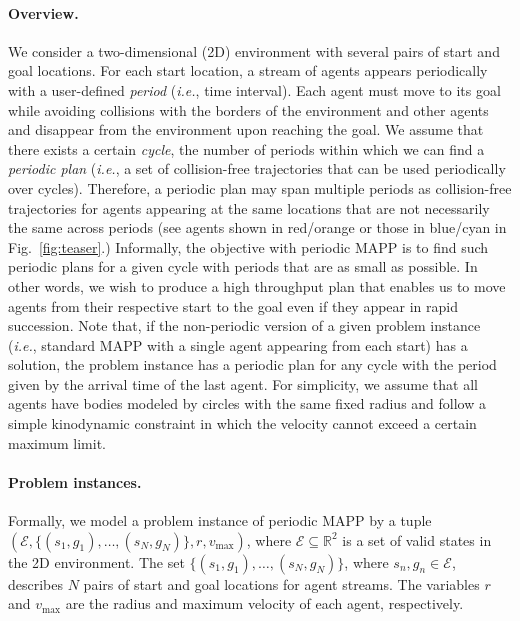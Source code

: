 \documentclass[letterpaper]{article} %
\def\ie{{\it i.e.}}
\begin{document}
\paragraph{Overview.}
We consider a two-dimensional (2D) environment with several pairs of start and goal locations. For each start location, a stream of agents appears periodically with a user-defined \emph{period} (\ie, time interval). Each agent must move to its goal while avoiding collisions with the borders of the environment and other agents and disappear from the environment upon reaching the goal. We assume that there exists a certain \emph{cycle}, the number of periods within which we can find a \emph{periodic plan} (\ie, a set of collision-free trajectories that can be used periodically over cycles). Therefore, a periodic plan may span multiple periods as collision-free trajectories for agents appearing at the same locations that are not necessarily the same across periods (see agents shown in red/orange or those in blue/cyan in Fig.~\ref{fig:teaser}.) Informally, the objective with periodic MAPP is to find such periodic plans for a given cycle with periods that are as small as possible. In other words, we wish to produce a high throughput plan that enables us to move agents from their respective start to the goal even if they appear in rapid succession. Note that, if the non-periodic version of a given problem instance (\ie, standard MAPP with a single agent appearing from each start) has a solution, the problem instance has a periodic plan for any cycle with the period given by the arrival time of the last agent. For simplicity, we assume that all agents have bodies modeled by circles with the same fixed radius and follow a simple kinodynamic constraint in which the velocity cannot exceed a certain maximum limit.

\paragraph{Problem instances.}
Formally, we model a problem instance of periodic MAPP by a tuple $(\mathcal{E}, \{(s_1,g_1),\dots,(s_N, g_N)\}, r, v_\mathrm{max})$, where $\mathcal{E}\subseteq \mathbb{R}^2$ is a set of valid states in the 2D environment. The set $\{(s_1,g_1),\dots,(s_N, g_N)\}$, where $s_n, g_n\in\mathcal{E}$, describes $N$ pairs of start and goal locations for agent streams. The variables $r$ and $v_\mathrm{max}$ are the radius and maximum velocity of each agent, respectively.
\end{document}
